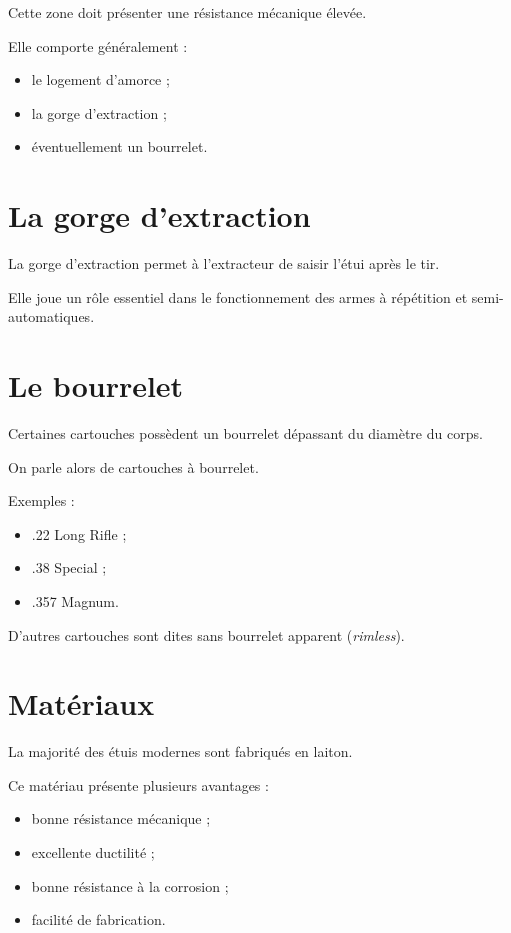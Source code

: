 Cette zone doit présenter une résistance mécanique élevée.

Elle comporte généralement :

\begin{itemize}
    \item le logement d'amorce ;
    \item la gorge d'extraction ;
    \item éventuellement un bourrelet.
\end{itemize}

\section{La gorge d'extraction}

La gorge d'extraction permet à l'extracteur de saisir l'étui après le tir.

Elle joue un rôle essentiel dans le fonctionnement des armes à répétition et
semi-automatiques.

\section{Le bourrelet}

Certaines cartouches possèdent un bourrelet dépassant du diamètre du corps.

On parle alors de cartouches à bourrelet.

Exemples :

\begin{itemize}
    \item .22 Long Rifle ;
    \item .38 Special ;
    \item .357 Magnum.
\end{itemize}

D'autres cartouches sont dites sans bourrelet apparent (\emph{rimless}).

\section{Matériaux}

La majorité des étuis modernes sont fabriqués en laiton.

Ce matériau présente plusieurs avantages :

\begin{itemize}
    \item bonne résistance mécanique ;
    \item excellente ductilité ;
    \item bonne résistance à la corrosion ;
    \item facilité de fabrication.
\end{itemize}

